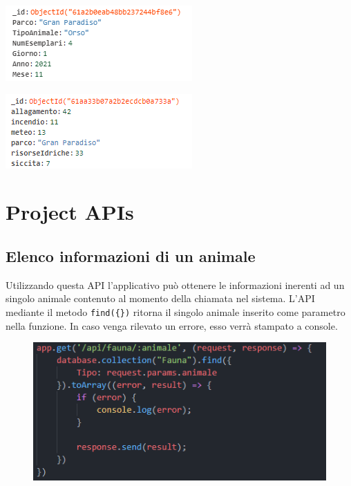 \begin{multicols}{2}
    \begin{Figure}
        \centering
        \includegraphics{Img/StoricoType.png}
        \label{fig:storico}
    \end{Figure}
    
    \begin{Figure}
        \centering
        \includegraphics{Img/RischioType.png}
        \label{fig:rischio}
    \end{Figure}
\end{multicols}

\newpage
\section{Project APIs}


\subsection{Elenco informazioni di un animale}
Utilizzando questa API l'applicativo può ottenere le informazioni inerenti ad un singolo animale contenuto al momento della chiamata nel sistema. L'API mediante il metodo \texttt{find(\{\})} ritorna il singolo animale inserito come parametro nella funzione. In caso venga rilevato un errore, esso verrà stampato a console.

\begin{figure}[ht]
    \centering
    \includegraphics{Img/getFaunaByAnimal.png}
    \label{fig:get_fauna_animale}
\end{figure}


